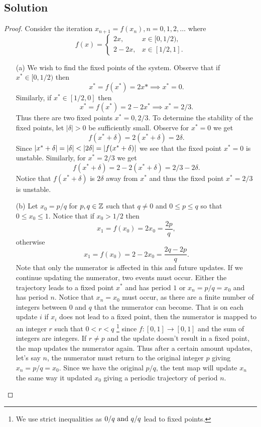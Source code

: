 \documentclass[12pt]{report}
\begin{document}
\begin{problem}
\subsection*{Solution}
\begin{proof}
Consider the iteration $x_{n+1} = f(x_n), n=0,1,2,\dots$ where
\[
    f(x) = \begin{cases}
        2x, & x \in [0,1/2),\\
        2 - 2x, &x \in [1/2,1].
      \end{cases}
\]
\begin{enumerate}
    \item [(a)]
    We wish to find the fixed points of the system. Observe that if $x^* \in [0,1/2)$ then
    \[
        x^* = f(x^*) = 2x* \implies x^* = 0.
    \]
    Similarly, if $x^* \in [1/2,0]$ then
    \[
        x^* = f(x^*) = 2 - 2x^* \implies x^* = 2/3.
    \]
    Thus there are two fixed points $x^*=0,2/3$. To determine the stability of the fixed points, let $|\delta| > 0$ be sufficiently small. Observe for $x^* = 0$ we get
    \[
        f(x^* + \delta) = 2(x^* + \delta) = 2\delta. 
    \]
    Since $|x^* + \delta| = |\delta| < |2\delta| = {\left|f(x^* + \delta)\right|}$ we see that the fixed point $x^* = 0$ is unstable. Similarly, for $x^* = 2/3$ we get
    \[
        f(x^* + \delta) = 2 - 2(x^* + \delta) = 2/3 - 2\delta.
    \]
    Notice that $f(x^* + \delta)$ is $2\delta$ away from $x^*$ and thus the fixed point $x^* = 2/3$ is unstable.


    \item [(b)]
    Let $x_0 = p/q$ for $p,q \in {\mathbb Z}$ such that $q \neq 0$ and $0 \leq p \leq q$ so that $0 \leq x_0 \leq 1$. Notice that if $x_0 > 1/2$ then 
    \[
        x_1 = f(x_0) = 2x_0 = \frac{2p}{q},
    \]
    otherwise
    \[
        x_1 = f(x_0) = 2 - 2x_0 = \frac{2q - 2p}{q}.
    \]
    Note that only the numerator is affected in this and future updates. If we continue updating the numerator, two events must occur. Either the trajectory leads to a fixed point $x^*$ and has period $1$ or $x_n = p/q = x_0$ and has period $n$. Notice that $x_n = x_0$ must occur, as there are a finite number of integers between $0$ and $q$ that the numerator can become. That is on each update $i$ if $x_i$ does not lead to a fixed point, then the numerator is mapped to an integer $r$ such that $0 < r < q$ \footnote{We use strict inequalities as $0/q {~\text{and}~} q/q$ lead to fixed points.} since $f: [0,1] \to [0,1]$ and the sum of integers are integers. If $r \neq p$ and the update doesn't result in a fixed point, the map updates the numerator again. Thus after a certain amount updates, let's say $n$, the numerator must return to the original integer $p$ giving $x_n = p/q = x_0$. Since we have the original $p/q$, the tent map will update $x_n$ the same way it updated $x_0$ giving a periodic trajectory of period $n$. 


\end{enumerate}
\end{proof}
\end{problem}
\end{document}
